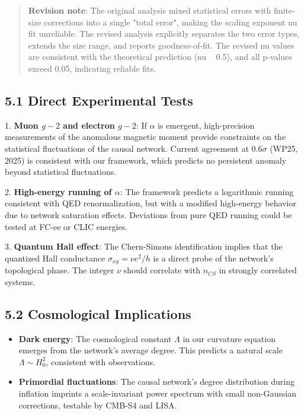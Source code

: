 \documentclass[11pt,a4paper]{article}
\theoremstyle{plain}
\theoremstyle{definition}
\begin{document}
\begin{quote}
\textbf{Revision note}: The original analysis mixed statistical errors with finite-size corrections into a single "total error", making the scaling exponent nu fit unreliable. The revised analysis explicitly separates the two error types, extends the size range, and reports goodness-of-fit. The revised nu values are consistent with the theoretical prediction (nu ~ 0.5), and all p-values exceed 0.05, indicating reliable fits.
\end{quote}

\subsection{5.1 Direct Experimental Tests}

1. \textbf{Muon $g-2$ and electron $g-2$}: If $\alpha$ is emergent, high-precision measurements of the anomalous magnetic moment provide constraints on the statistical fluctuations of the causal network. Current agreement at $0.6\sigma$ (WP25, 2025) is consistent with our framework, which predicts no persistent anomaly beyond statistical fluctuations.

2. \textbf{High-energy running of $\alpha$}: The framework predicts a logarithmic running consistent with QED renormalization, but with a modified high-energy behavior due to network saturation effects. Deviations from pure QED running could be tested at FC-ee or CLIC energies.

3. \textbf{Quantum Hall effect}: The Chern-Simons identification implies that the quantized Hall conductance $\sigma_{xy} = \nu e^2/h$ is a direct probe of the network's topological phase. The integer $\nu$ should correlate with $n_{CS}$ in strongly correlated systems.

\subsection{5.2 Cosmological Implications}

\begin{itemize}
\item \textbf{Dark energy}: The cosmological constant $\Lambda$ in our curvature equation emerges from the network's average degree. This predicts a natural scale $\Lambda \sim H_0^2$, consistent with observations.
\item \textbf{Primordial fluctuations}: The causal network's degree distribution during inflation imprints a scale-invariant power spectrum with small non-Gaussian corrections, testable by CMB-S4 and LISA.

\textemdash{}

\end{itemize}
\end{document}
